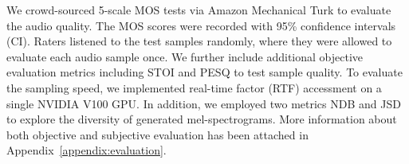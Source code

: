 We crowd-sourced 5-scale MOS tests via Amazon Mechanical Turk to evaluate the audio quality. The MOS scores were recorded with 95\% confidence intervals (CI). Raters listened to the test samples randomly, where they were allowed to evaluate each audio sample once. We further include additional objective evaluation metrics including  STOI and PESQ to test sample quality. To evaluate the sampling speed, we implemented real-time factor (RTF) accessment on a single NVIDIA V100 GPU. In addition, we employed two metrics NDB and JSD to explore the diversity of generated mel-spectrograms. More information about both objective and subjective evaluation has been attached in Appendix~\ref{appendix:evaluation}.


\begin{table*}[]
  \centering
  \small
  \begin{minipage}[t]{0.7\linewidth}
  \centering
\end{minipage}
\end{table*}
